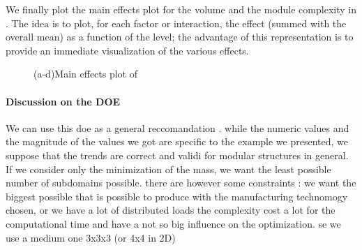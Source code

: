 We finally plot the main effects plot for the volume and the module complexity in . The idea is to plot, for each factor or interaction, the effect (summed with the overall mean) as a function of the level; the advantage of this representation is to provide an immediate visualization of the various effects.
\begin{figure}
    \centering
    \bigskip
    \caption{(a-d)Main effects plot of }
    \label{fig:05_doe_main_eff}
\end{figure}
\paragraph{Discussion on the DOE}
We can use this doe as a general reccomandation . while the numeric values and the magnitude of the values we got are specific to the example we presented, we suppose that the trends are correct and validi for modular structures in general. If we consider only the minimization of the mass, we want the least possible number of subdomains possible. there are however some constraints : we want the biggest possible that is possible to produce with the manufacturing technomogy chosen, or we have a lot of distributed loads
the complexity cost a lot for the computational time and have a not so big influence on the optimization. se we use a medium one 3x3x3 (or 4x4 in 2D)


